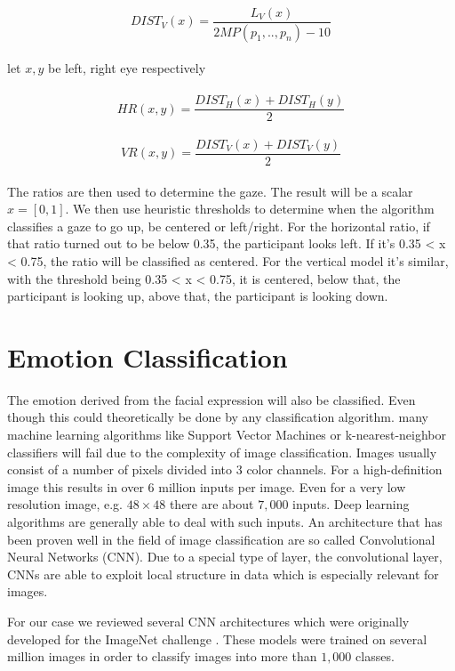 \documentclass{article}
\begin{document}
\\
\begin{equation}
DIST_V(x) = \frac{L_V(x)}{2MP(p_1,..,p_n)-10}
\end{equation}
\\
let $x,y$ be left, right eye respectively\\
\\
\begin{equation}
HR(x,y) = \frac{DIST_H(x)+DIST_H(y)}{2}
\end{equation}
\\
\begin{equation}
VR(x,y) = \frac{DIST_V(x)+DIST_V(y)}{2}
\end{equation}
\\

The ratios are then used to determine the gaze. The result will be a scalar $x= [0,1]$. We then use heuristic thresholds to determine when the algorithm classifies a gaze to go up, be centered or left/right. For the horizontal ratio, if that ratio turned out to be below 0.35, the participant looks left. If it’s 0.35 < x < 0.75, the ratio will be classified as centered. For the vertical model it’s similar, with the threshold being 0.35 < x < 0.75, it is centered, below that, the participant is looking up, above that, the participant is looking down.

\section{Emotion Classification}
The emotion derived from the facial expression will also be classified. Even though this could theoretically be done by any classification algorithm. many machine learning algorithms like Support Vector Machines or k-nearest-neighbor classifiers will fail due to the complexity of image classification. Images usually consist of a number of pixels divided into $3$ color channels. For a high-definition image this results in over $6$ million inputs per image. Even for a very low resolution image, e.g. $48 \times 48$ there are about $7,000$ inputs. Deep learning algorithms are generally able to deal with such inputs. An architecture that has been proven well in the field of image classification are so called Convolutional Neural Networks (CNN). Due to a special type of layer, the convolutional layer, CNNs are able to exploit local structure in data which is especially relevant for images.

For our case we reviewed several CNN architectures which were originally developed for the ImageNet challenge \cite{russakovsky2015imagenet}. These models were trained on several million images in order to classify images into more than $1,000$ classes.
\end{document}
